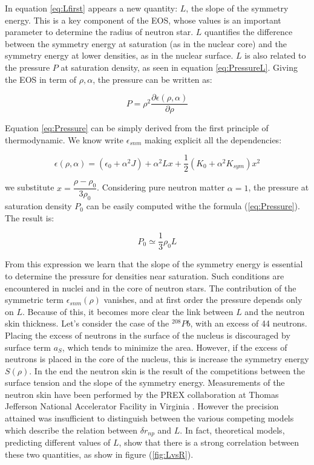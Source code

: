 In equation \ref{eq:Lfirst} appears a new quantity: $L$, the slope of the symmetry energy. This is a key component of the EOS, whose values is an important parameter to determine the radius of neutron star. $L$ quantifies the difference between the symmetry energy at saturation (as in the nuclear core) and the symmetry energy at lower densities, as in the nuclear surface. $L$ is also related to the pressure $P$ at saturation density, as seen in equation \ref{eq:PressureL}. Giving the EOS in term of $\rho,\alpha$, the pressure can be written as:

\begin{equation} \label{eq:Pressure}
P = \rho^{2} \dfrac{\partial \epsilon(\rho, \alpha)}{\partial \rho}
\end{equation} 

Equation \ref{eq:Pressure} can be simply derived from the first principle of thermodynamic.
We know write $\epsilon_{snm}$ making explicit all the dependencies:

\begin{equation}
\epsilon (\rho, \alpha) = (\epsilon_{0} + \alpha^{2} J) + \alpha^{2}Lx + \frac{1}{2} (K_{0} + \alpha^{2}K_{sym})x^{2}
\end{equation}

we substitute $x = \dfrac{\rho - \rho_{0}}{3 \rho_{0}}$. Considering pure neutron matter $\alpha = 1$, the pressure at saturation density $P_{0}$ can be easily computed withe the formula (\ref{eq:Pressure}). The result is:

\begin{equation} \label{eq:PressureL}
P_{0} \simeq \dfrac{1}{3}\rho_{0} L
\end{equation}

From this expression we learn that the slope of the symmetry energy is essential to determine the pressure for densities near saturation. Such conditions are encountered in nuclei and in the core of neutron stars. The contribution of the symmetric term $\epsilon_{snm}(\rho)$ vanishes, and at first order the pressure depends only on $L$. Because of this, it becomes more clear the link between $L$ and the neutron skin thickness. Let's consider the case of the $^{208}Pb$, with an excess of 44 neutrons. Placing the excess of neutrons in the surface of the nucleus is discouraged by surface term $a_{S}$, which tends to minimize the area. However, if the excess of neutrons is placed in the core of the nucleus, this is increase the symmetry energy $S(\rho)$. In the end the neutron skin is the result of the competitions between the surface tension and the slope of the symmetry energy.
 Measurements of the neutron skin have been performed by the PREX collaboration at Thomas Jefferson National Accelerator Facility in Virginia \cite{Abrahamyan:2012gp}. However the precision attained was insufficient to distinguish between the various competing models which describe the relation between $\delta r_{np}$ and $L$. In fact, theoretical models, predicting different values of $L$, show that there is a strong correlation between these two quantities, as show in figure (\ref{fig:LvsR}).

